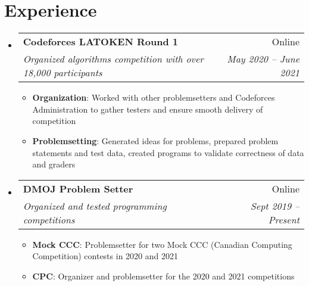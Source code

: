 \documentclass[letterpaper,11pt]{article}
\makeatletter
\newcommand{\resumeItem}[2]{
  \item\small{
    \textbf{#1}{: #2 \vspace{-2pt}}
  }
}
\newcommand{\resumeSubheading}[4]{
  \vspace{-1pt}\item
    \begin{tabular*}{0.97\textwidth}[t]{l@{\extracolsep{\fill}}r}
      \textbf{#1} & #2 \\
      \textit{\small#3} & \textit{\small #4} \\
    \end{tabular*}\vspace{-5pt}
}
\newcommand{\resumeSubHeadingListStart}{\begin{itemize}[leftmargin=*]}
\newcommand{\resumeSubHeadingListEnd}{\end{itemize}}
\newcommand{\resumeItemListStart}{\begin{itemize}}
\newcommand{\resumeItemListEnd}{\end{itemize}\vspace{-5pt}}
\makeatother
\begin{document}
\section{Experience}
  \resumeSubHeadingListStart
    \resumeSubheading
      {Codeforces LATOKEN Round 1}{Online}
      {Organized algorithms competition with over 18,000 participants}{May 2020 -- June 2021}
      \resumeItemListStart
        \resumeItem{Organization}
          {Worked with other problemsetters and Codeforces Administration to gather testers and ensure smooth delivery of competition}
        \resumeItem{Problemsetting}
          {Generated ideas for problems, prepared problem statements and test data, created programs to validate correctness of data and graders}
      \resumeItemListEnd
    
    \resumeSubheading
      {DMOJ Problem Setter}{Online}
      {Organized and tested programming competitions}{Sept 2019 -- Present}
      \resumeItemListStart
        \resumeItem{Mock CCC}
          {Problemsetter for two Mock CCC (Canadian Computing Competition) contests in 2020 and 2021}
        \resumeItem{CPC}
          {Organizer and problemsetter for the 2020 and 2021 competitions}
      \resumeItemListEnd
    

  \resumeSubHeadingListEnd

\end{document}
